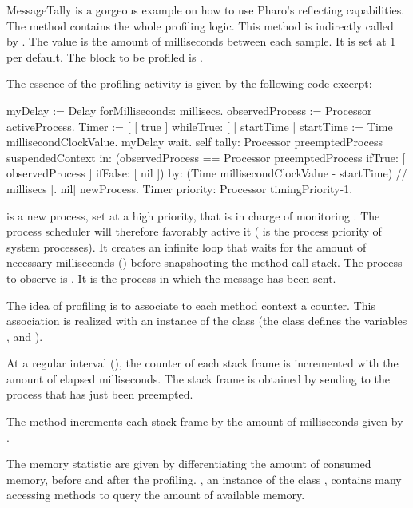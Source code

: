 \documentclass[a4paper,10pt,twoside]{book}
\begin{document}
MessageTally is a gorgeous example on how to use Pharo's reflecting capabilities. The method  contains the whole profiling logic. This method is indirectly called by . The  value is the amount of milliseconds between each sample. It is set at 1 per default. The block to be profiled is .

The essence of the profiling activity is given by the following code excerpt:

\begin{code}
myDelay := Delay forMilliseconds: millisecs.
observedProcess := Processor activeProcess.
Timer := [
	[ true ] whileTrue: [
		| startTime |
		startTime := Time millisecondClockValue.
		myDelay wait.
		self
			tally: Processor preemptedProcess suspendedContext
			in: (observedProcess == Processor preemptedProcess 
					ifTrue: [ observedProcess ] ifFalse: [ nil ])
			by: (Time millisecondClockValue - startTime) // millisecs ].
	nil] newProcess.
Timer priority: Processor timingPriority-1.
\end{code}

 is a new process, set at a high priority, that is in charge of monitoring . The process scheduler will therefore favorably active it ( is the process priority of system processes). It creates an infinite loop that waits for the amount of necessary milliseconds () before snapshooting the method call stack. The process to observe is . It is the process in which the message  has been sent. 

The idea of profiling is to associate to each method context a counter. This association is realized with an instance of the class  (the class defines the variables ,  and ).

At a regular interval (), the counter of each stack frame is incremented with the amount of elapsed milliseconds. The stack frame is obtained by sending  to the process that has just been preempted.

The method  increments each stack frame by the amount of milliseconds given by .

The memory statistic are given by differentiating the amount of consumed memory, before and after the profiling. , an instance of the class , contains many accessing methods to query the amount of available memory.
\end{document}
